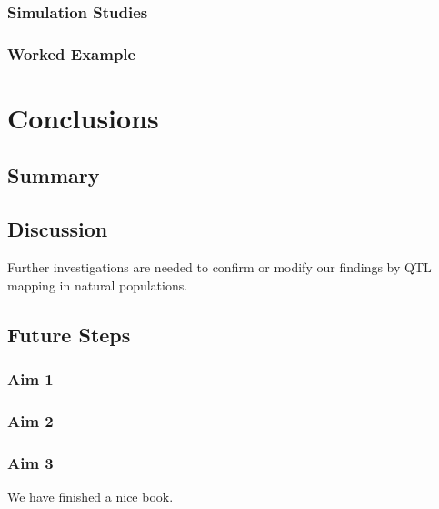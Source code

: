 \documentclass[]{book}
\theoremstyle{definition}
\theoremstyle{definition}
\theoremstyle{remark}
\begin{document}
\subsection{Simulation Studies}\label{simulation-studies-1}

\subsection{Worked Example}\label{worked-example-1}

\chapter{Conclusions}\label{conclusions}

\section{Summary}\label{summary}

\section{Discussion}\label{discussion-2}

Further investigations are needed to confirm or modify our findings by
QTL mapping in natural populations.

\section{Future Steps}\label{future-steps}

\subsection{Aim 1}\label{aim-1}

\subsection{Aim 2}\label{aim-2}

\subsection{Aim 3}\label{aim-3}

We have finished a nice book.


\end{document}
